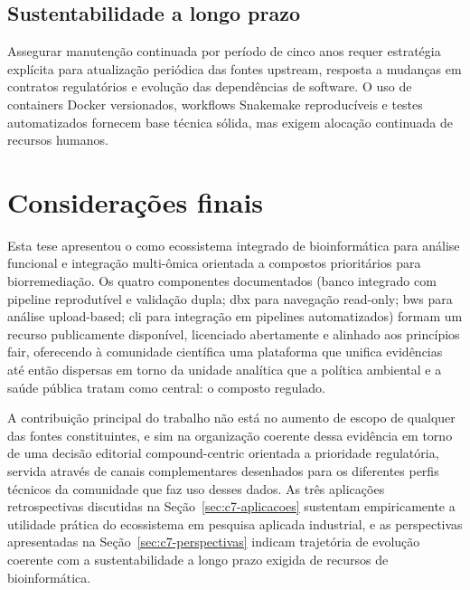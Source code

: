 \subsection{Sustentabilidade a longo prazo}

Assegurar manutenção continuada por período de cinco anos requer estratégia explícita para atualização periódica das fontes upstream, resposta a mudanças em contratos regulatórios e evolução das dependências de software. O uso de containers Docker versionados, workflows Snakemake reproducíveis e testes automatizados fornecem base técnica sólida, mas exigem alocação continuada de recursos humanos.

\section{Considerações finais}
\label{sec:c7-final}

Esta tese apresentou o \biorempp{} como ecossistema integrado de bioinformática para análise funcional e integração multi-ômica orientada a compostos prioritários para biorremediação. Os quatro componentes documentados (banco integrado com pipeline reprodutível e validação dupla; \gls{dbx} para navegação read-only; \gls{bws} para análise upload-based; \gls{cli} para integração em pipelines automatizados) formam um recurso publicamente disponível, licenciado abertamente e alinhado aos princípios \gls{fair}, oferecendo à comunidade científica uma plataforma que unifica evidências até então dispersas em torno da unidade analítica que a política ambiental e a saúde pública tratam como central: o composto regulado.

A contribuição principal do trabalho não está no aumento de escopo de qualquer das fontes constituintes, e sim na organização coerente dessa evidência em torno de uma decisão editorial compound-centric orientada a prioridade regulatória, servida através de canais complementares desenhados para os diferentes perfis técnicos da comunidade que faz uso desses dados. As três aplicações retrospectivas discutidas na Seção~\ref{sec:c7-aplicacoes} sustentam empiricamente a utilidade prática do ecossistema em pesquisa aplicada industrial, e as perspectivas apresentadas na Seção~\ref{sec:c7-perspectivas} indicam trajetória de evolução coerente com a sustentabilidade a longo prazo exigida de recursos de bioinformática.

